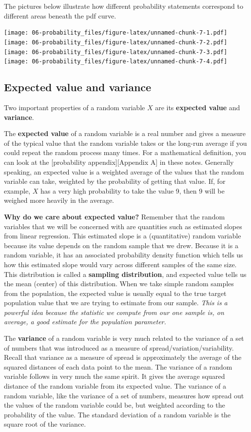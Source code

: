 \documentclass[
]{book}
\begin{document}
The pictures below illustrate how different probability statements correspond to different areas beneath the pdf curve.

\texttt{[image: 06-probability\_files/figure-latex/unnamed-chunk-7-1.pdf]} \texttt{[image: 06-probability\_files/figure-latex/unnamed-chunk-7-2.pdf]} \texttt{[image: 06-probability\_files/figure-latex/unnamed-chunk-7-3.pdf]} \texttt{[image: 06-probability\_files/figure-latex/unnamed-chunk-7-4.pdf]}

\hypertarget{expected-value-and-variance}{%
\subsection{Expected value and variance}\label{expected-value-and-variance}}

Two important properties of a random variable \(X\) are its \textbf{expected value} and \textbf{variance}.

The \textbf{expected value} of a random variable is a real number and gives a measure of the typical value that the random variable takes or the long-run average if you could repeat the random process many times. For a mathematical definition, you can look at the {[}probability appendix{]}{[}Appendix A{]} in these notes. Generally speaking, an expected value is a weighted average of the values that the random variable can take, weighted by the probability of getting that value. If, for example, \(X\) has a very high probability to take the value 9, then 9 will be weighed more heavily in the average.

\textbf{Why do we care about expected value?} Remember that the random variables that we will be concerned with are quantities such as estimated slopes from linear regression. This estimated slope is a (quantitative) random variable because its value depends on the random sample that we drew. Because it is a random variable, it has an associated probability density function which tells us how this estimated slope would vary across different samples of the same size. This distribution is called a \textbf{sampling distribution}, and expected value tells us the mean (center) of this distribution. When we take simple random samples from the population, the expected value is usually equal to the true target population value that we are trying to estimate from our sample. \emph{This is a powerful idea because the statistic we compute from our one sample is, on average, a good estimate for the population parameter.}

The \textbf{variance} of a random variable is very much related to the variance of a set of numbers that was introduced as a measure of spread/variation/variability. Recall that variance as a measure of spread is approximately the average of the squared distances of each data point to the mean. The variance of a random variable follows in very much the same spirit. It gives the average squared distance of the random variable from its expected value. The variance of a random variable, like the variance of a set of numbers, measures how spread out the values of the random variable could be, but weighted according to the probability of the value. The standard deviation of a random variable is the square root of the variance.
\end{document}
